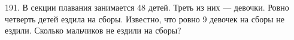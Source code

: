 191. В секции плавания занимается 48 детей. Треть из них --- девочки. Ровно четверть детей ездила на сборы. Известно, что ровно 9 девочек на сборы не ездили. Сколько мальчиков не ездили на сборы?\\
